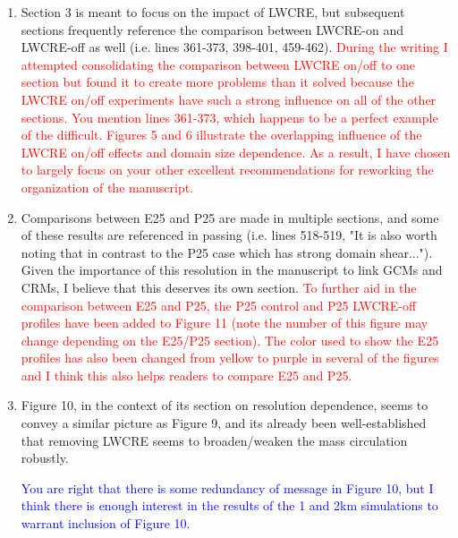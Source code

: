 \documentclass[draft]{agujournal2019}
\begin{document}
\begin{enumerate}
  \item Section 3 is meant to focus on the impact of LWCRE, but subsequent sections frequently reference the comparison between LWCRE-on and LWCRE-off as well (i.e. lines 361-373, 398-401, 459-462).
  \textcolor{red}{During the writing I attempted consolidating the comparison between LWCRE on/off to one section but found it to create more problems than it 
  solved because the LWCRE on/off experiments have such a strong influence on all of the other sections.  You mention lines 361-373, which happens to be a 
  perfect example of the difficult.  Figures 5 and 6 illustrate the overlapping influence of the LWCRE on/off effects and domain size dependence.  
  As a result, I have chosen to largely focus on your other excellent recommendations for reworking the organization of the manuscript.}
  \item Comparisons between E25 and P25 are made in multiple sections, and some of these results are referenced in passing (i.e. lines 518-519, "It is also worth noting that in contrast to the P25 case which has strong domain shear..."). Given the importance of this resolution in the manuscript to link GCMs and CRMs, I believe that this deserves its own section.
  \textcolor{red}{To further aid in the comparison between E25 and P25, the P25 control and P25 LWCRE-off profiles have been added to Figure 11 (note the number of this figure may change depending on the E25/P25 section).  The color used to show the E25 profiles has also been changed from yellow to purple in several of the figures and I think this also helps readers to compare E25 and P25.}
  \item Figure 10, in the context of its section on resolution dependence, seems to convey a similar picture as Figure 9, and its already been well-established that removing LWCRE seems to broaden/weaken the mass circulation robustly.  
  
  \textcolor{blue}{You are right that there is some redundancy of message in Figure 10, but I think there is enough interest in the results of the 1 and 2km simulations to warrant inclusion of Figure 10. }
  

\end{enumerate}
\end{document}
